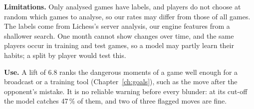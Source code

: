 \documentclass[a4paper,oneside,bibliography=totoc]{scrbook}
\newcommand{\stale}[1]{\textcolor{BurntOrange}{#1}}
\begin{document}
\textbf{Limitations.} Only analysed games have labels, and players do not choose at random which games to
analyse, so our rates may differ from those of all games. The labels come from Lichess's server analysis, our
engine features from a shallower search. One month cannot show changes over time, and the same players occur in
training and test games, so a model may partly learn their habits; a split by player would test this.

\textbf{Use.} A lift of \stale{6.8} ranks the dangerous moments of a game well enough for a broadcast or a
training tool (Chapter~\ref{ch:goals}), such as the move after the opponent's mistake. It is no reliable warning
before every blunder: at its cut-off the model catches \stale{47}\,\% of them, and two of three flagged moves are
fine.


\end{document}

